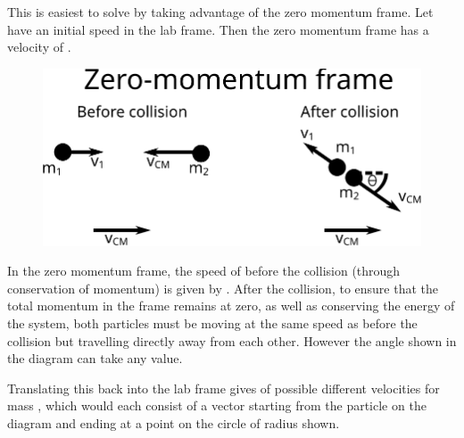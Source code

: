 
\begin{problem}   %
{ } 
{} 
{This is easiest to solve by taking advantage of the zero momentum frame. Let  have an initial speed  in the lab frame. Then the zero momentum frame has a velocity of .

\begin{figure}[h]
\centering
\includegraphics[width=1.0\textwidth]{../../../figures/dynamics_zero_momentum_frame_deflection.svg}
\caption{}\label{fig:dynamics_zero_momentum_frame_deflection}
\end{figure}


In the zero momentum frame, the speed of  before the collision (through conservation of momentum) is given by . After the collision, to ensure that the total momentum in the frame remains at zero, as well as conserving the energy of the system, both particles must be moving at the same speed as before the collision but travelling directly away from each other. However the angle \vari{\theta} shown in the diagram can take any value.


Translating this back into the lab frame gives of possible different velocities for mass  , which would each consist of a vector starting from the particle on the diagram and ending at a point on the circle of radius  shown.

}
\end{problem}
